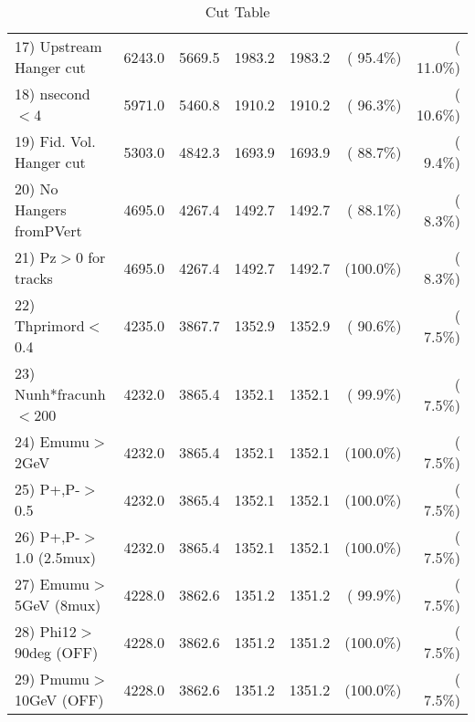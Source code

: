 \begin{table}[h!]
\begin{tabular}{||l||r|r|r|r|r|r||}
 17) Upstream Hanger cut  &       6243.0 &       5669.5 &       1983.2 &       1983.2 & ( 95.4\%) & ( 11.0\%) \\
 18) nsecond$<$4          &       5971.0 &       5460.8 &       1910.2 &       1910.2 & ( 96.3\%) & ( 10.6\%) \\
 19) Fid. Vol. Hanger cut &       5303.0 &       4842.3 &       1693.9 &       1693.9 & ( 88.7\%) & (  9.4\%) \\
 20) No Hangers fromPVert &       4695.0 &       4267.4 &       1492.7 &       1492.7 & ( 88.1\%) & (  8.3\%) \\
 21) Pz$>$0 for tracks    &       4695.0 &       4267.4 &       1492.7 &       1492.7 & (100.0\%) & (  8.3\%) \\
 22) Thprimord$<$0.4      &       4235.0 &       3867.7 &       1352.9 &       1352.9 & ( 90.6\%) & (  7.5\%) \\
 23) Nunh*fracunh$<$200   &       4232.0 &       3865.4 &       1352.1 &       1352.1 & ( 99.9\%) & (  7.5\%) \\
 24) Emumu$>$2GeV         &       4232.0 &       3865.4 &       1352.1 &       1352.1 & (100.0\%) & (  7.5\%) \\
 25) P+,P-$>$0.5          &       4232.0 &       3865.4 &       1352.1 &       1352.1 & (100.0\%) & (  7.5\%) \\
 26) P+,P-$>$1.0 (2.5mux) &       4232.0 &       3865.4 &       1352.1 &       1352.1 & (100.0\%) & (  7.5\%) \\
 27) Emumu$>$5GeV  (8mux) &       4228.0 &       3862.6 &       1351.2 &       1351.2 & ( 99.9\%) & (  7.5\%) \\
 28) Phi12$>$90deg  (OFF) &       4228.0 &       3862.6 &       1351.2 &       1351.2 & (100.0\%) & (  7.5\%) \\
 29) Pmumu$>$10GeV  (OFF) &       4228.0 &       3862.6 &       1351.2 &       1351.2 & (100.0\%) & (  7.5\%) \\
 \hline
 \hline
 \end{tabular}
 \caption{Cut Table           }
 \label{tab-cutcohjpsi-mumu_ccdis}
 \end{table}

